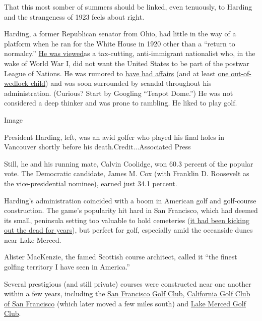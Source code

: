 That this most somber of summers should be linked, even tenuously, to
Harding and the strangeness of 1923 feels about right.

Harding, a former Republican senator from Ohio, had little in the way of
a platform when he ran for the White House in 1920 other than a ``return
to normalcy.''
\href{https://www.whitehouse.gov/about-the-white-house/presidents/warren-g-harding/}{He
was viewed}as a tax-cutting, anti-immigrant nationalist who, in the wake
of World War I, did not want the United States to be part of the postwar
League of Nations. He was rumored to
\href{https://www.nytimes.com/2014/07/13/magazine/letters-warren-g-harding.html}{have
had affairs} (and at least
\href{https://www.nytimes.com/2015/08/13/us/dna-is-said-to-solve-a-mystery-of-warren-hardings-love-life.html}{one
out-of-wedlock child}) and was soon surrounded by scandal throughout his
administration. (Curious? Start by Googling ``Teapot Dome.'') He was not
considered a deep thinker and was prone to rambling. He liked to play
golf.

Image

President Harding, left, was an avid golfer who played his final holes
in Vancouver shortly before his death.Credit...Associated Press

Still, he and his running mate, Calvin Coolidge, won 60.3 percent of the
popular vote. The Democratic candidate, James M. Cox (with Franklin D.
Roosevelt as the vice-presidential nominee), earned just 34.1 percent.

Harding's administration coincided with a boom in American golf and
golf-course construction. The game's popularity hit hard in San
Francisco, which had deemed its small, peninsula setting too valuable to
hold cemeteries
(\href{https://www.nytimes.com/2016/02/06/sports/football/the-town-of-colma-where-san-franciscos-dead-live.html}{it
had been kicking out the dead for years}), but perfect for golf,
especially amid the oceanside dunes near Lake Merced.

Alister MacKenzie, the famed Scottish course architect, called it ``the
finest golfing territory I have seen in America.''

Several prestigious (and still private) courses were constructed near
one another within a few years, including the
\href{https://www.linksmagazine.com/classic-course-san-francisco-golf-club/}{San
Francisco Golf Club}, \href{https://www.calclub.org/\#course}{California
Golf Club of San Francisco} (which later moved a few miles south) and
\href{https://www.lmgc.org/Default.aspx?p=dynamicmodule\&pageid=106\&ssid=100120\&vnf=1\#:~:text=Founded\%20in\%201922\%2C\%20the\%20club,met\%20to\%20begin\%20organizational\%20efforts.}{Lake
Merced Golf Club}.


